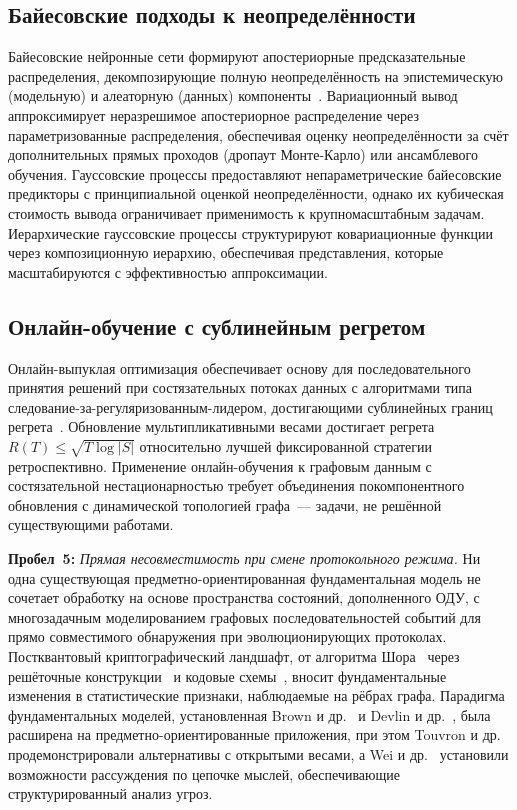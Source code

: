 \subsection{Байесовские подходы к неопределённости}

Байесовские нейронные сети формируют апостериорные предсказательные распределения, декомпозирующие полную неопределённость на эпистемическую (модельную) и алеаторную (данных) компоненты~\cite{Gal2016,Blundell2015,Lakshminarayanan2017,Kendall2017}. Вариационный вывод аппроксимирует неразрешимое апостериорное распределение через параметризованные распределения, обеспечивая оценку неопределённости за счёт дополнительных прямых проходов (дропаут Монте-Карло) или ансамблевого обучения. Гауссовские процессы предоставляют непараметрические байесовские предикторы с принципиальной оценкой неопределённости, однако их кубическая стоимость вывода ограничивает применимость к крупномасштабным задачам. Иерархические гауссовские процессы структурируют ковариационные функции через композиционную иерархию, обеспечивая представления, которые масштабируются с эффективностью аппроксимации.

\subsection{Онлайн-обучение с сублинейным регретом}

Онлайн-выпуклая оптимизация обеспечивает основу для последовательного принятия решений при состязательных потоках данных с алгоритмами типа следование-за-регуляризованным-лидером, достигающими сублинейных границ регрета~\cite{Shalev2012,Arjovsky2017}. Обновление мультипликативными весами достигает регрета $R(T)\leq\sqrt{T\log|S|}$ относительно лучшей фиксированной стратегии ретроспективно. Применение онлайн-обучения к графовым данным с состязательной нестационарностью требует объединения покомпонентного обновления с динамической топологией графа~--- задачи, не решённой существующими работами.

\noindent\textbf{Пробел~5:} \emph{Прямая несовместимость при смене протокольного режима.} Ни одна существующая предметно-ориентированная фундаментальная модель не сочетает обработку на основе пространства состояний, дополненного ОДУ, с многозадачным моделированием графовых последовательностей событий для прямо совместимого обнаружения при эволюционирующих протоколах. Постквантовый криптографический ландшафт, от алгоритма Шора~\cite{Shor1997} через решёточные конструкции~\cite{Ducas2018,Proos2003} и кодовые схемы~\cite{McEliece1978}, вносит фундаментальные изменения в статистические признаки, наблюдаемые на рёбрах графа. Парадигма фундаментальных моделей, установленная Brown и др.~\cite{Brown2020} и Devlin и др.~\cite{Devlin2019}, была расширена на предметно-ориентированные приложения, при этом Touvron и др.~\cite{Touvron2023} продемонстрировали альтернативы с открытыми весами, а Wei и др.~\cite{Wei2022cot} установили возможности рассуждения по цепочке мыслей, обеспечивающие структурированный анализ угроз.

